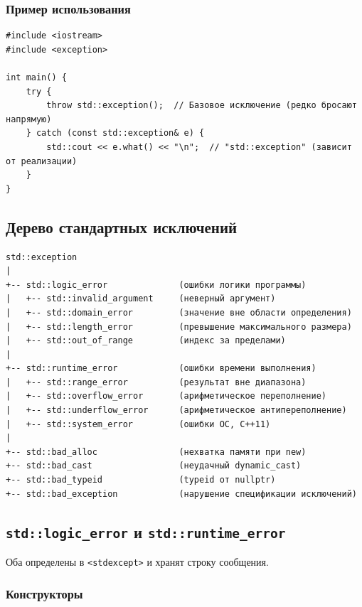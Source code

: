 \documentclass[a4paper,12pt]{article}
\begin{document}
\subsubsection{Пример использования}

\begin{lstlisting}
#include <iostream>
#include <exception>

int main() {
    try {
        throw std::exception();  // Базовое исключение (редко бросают напрямую)
    } catch (const std::exception& e) {
        std::cout << e.what() << "\n";  // "std::exception" (зависит от реализации)
    }
}
\end{lstlisting}

\subsection{Дерево стандартных исключений}

\begin{lstlisting}[numbers=none,basicstyle=\ttfamily\footnotesize]
std::exception
|
+-- std::logic_error              (ошибки логики программы)
|   +-- std::invalid_argument     (неверный аргумент)
|   +-- std::domain_error         (значение вне области определения)
|   +-- std::length_error         (превышение максимального размера)
|   +-- std::out_of_range         (индекс за пределами)
|
+-- std::runtime_error            (ошибки времени выполнения)
|   +-- std::range_error          (результат вне диапазона)
|   +-- std::overflow_error       (арифметическое переполнение)
|   +-- std::underflow_error      (арифметическое антипереполнение)
|   +-- std::system_error         (ошибки ОС, C++11)
|
+-- std::bad_alloc                (нехватка памяти при new)
+-- std::bad_cast                 (неудачный dynamic_cast)
+-- std::bad_typeid               (typeid от nullptr)
+-- std::bad_exception            (нарушение спецификации исключений)
\end{lstlisting}

\subsection{\texttt{std::logic\_error} и \texttt{std::runtime\_error}}

Оба определены в \texttt{<stdexcept>} и хранят строку сообщения.

\subsubsection{Конструкторы}
\end{document}
